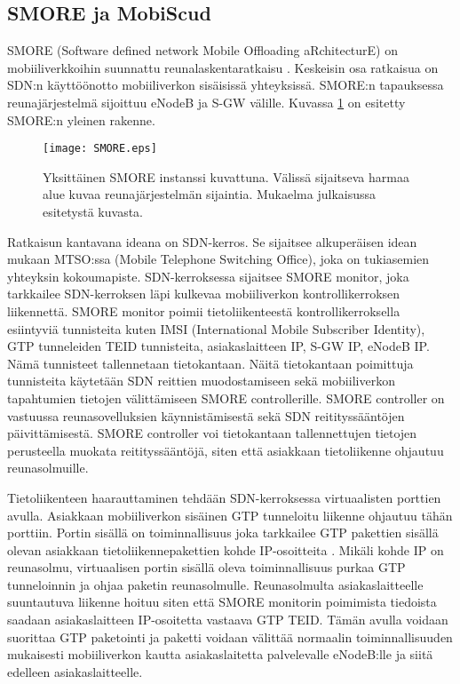 
\subsection{SMORE ja MobiScud} \label{smore}
SMORE (Software defined network Mobile Offloading aRchitecturE) on mobiiliverkkoihin suunnattu reunalaskentaratkaisu \cite{cho2014smore}.
Keskeisin osa ratkaisua on SDN:n käyttöönotto mobiiliverkon sisäisissä yhteyksissä.
SMORE:n tapauksessa reunajärjestelmä sijoittuu eNodeB ja S-GW välille. Kuvassa \ref{fig:smore} on esitetty SMORE:n yleinen rakenne.

\begin{figure}[tb]
\texttt{[image: SMORE.eps]}
\caption{Yksittäinen SMORE instanssi kuvattuna. Välissä sijaitseva harmaa alue kuvaa reunajärjestelmän sijaintia. Mukaelma julkaisussa \cite{cho2014smore} esitetystä kuvasta.} \label{fig:smore}
\end{figure}


Ratkaisun kantavana ideana on SDN-kerros. Se sijaitsee alkuperäisen idean mukaan MTSO:ssa (Mobile Telephone Switching Office), joka on tukiasemien yhteyksin kokoumapiste.
SDN-kerroksessa sijaitsee SMORE monitor, joka tarkkailee SDN-kerroksen läpi kulkevaa mobiiliverkon kontrollikerroksen liikennettä. SMORE monitor poimii tietoliikenteestä kontrollikerroksella esiintyviä tunnisteita kuten IMSI (International Mobile Subscriber Identity), GTP tunneleiden TEID tunnisteita, asiakaslaitteen IP, S-GW IP, eNodeB IP. Nämä tunnisteet tallennetaan tietokantaan.
Näitä tietokantaan poimittuja tunnisteita käytetään SDN reittien muodostamiseen sekä mobiiliverkon tapahtumien tietojen välittämiseen SMORE controllerille.
SMORE controller on vastuussa reunasovelluksien käynnistämisestä sekä SDN reitityssääntöjen päivittämisestä. SMORE controller voi tietokantaan tallennettujen tietojen perusteella muokata reitityssääntöjä, siten että asiakkaan tietoliikenne ohjautuu reunasolmuille. 

Tietoliikenteen haarauttaminen tehdään SDN-kerroksessa virtuaalisten porttien avulla.
Asiakkaan mobiiliverkon sisäinen GTP tunneloitu liikenne ohjautuu tähän porttiin.
Portin sisällä on toiminnallisuus joka tarkkailee GTP pakettien sisällä olevan asiakkaan tietoliikennepakettien kohde IP-osoitteita \cite{cho2014smore}.
Mikäli kohde IP on reunasolmu, virtuaalisen portin sisällä oleva toiminnallisuus purkaa GTP tunneloinnin ja ohjaa paketin reunasolmulle.
Reunasolmulta asiakaslaitteelle suuntautuva liikenne hoituu siten että SMORE monitorin poimimista tiedoista saadaan asiakaslaitteen IP-osoitetta vastaava GTP TEID.
Tämän avulla voidaan suorittaa GTP paketointi ja paketti voidaan välittää normaalin toiminnallisuuden mukaisesti mobiiliverkon kautta asiakaslaitetta palvelevalle eNodeB:lle ja siitä edelleen asiakaslaitteelle. 

